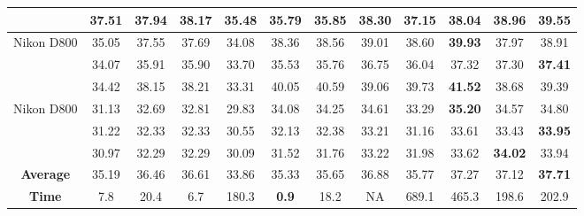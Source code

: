 \begin{table}
\begin{adjustwidth}{-2cm}{}
\begin{center}
\begin{tabular}{|c||c|c|c|c|c|c|c|c|c|c|c|}
\cline{2-12}    
& 37.51 & 37.94 & 38.17 & 35.48 & 35.79 & 35.85 & 38.30 & 37.15 & 38.04 & 38.96 & \textbf{39.55}
\\
\hline
\multirow{3}{*}{Nikon D800} 
& 35.05 & 37.55 & 37.69 & 34.08 & 38.36 & 38.56 & 39.01 & 38.60 & \textbf{39.93} & 37.97 & 38.91
\\ 
\cline{2-12} 
\multirow{3}{*}{ISO = 3200}   
& 34.07 & 35.91 & 35.90 & 33.70 & 35.53 & 35.76 & 36.75 & 36.04 & 37.32 & 37.30 & \textbf{37.41}
\\ 
\cline{2-12}    
& 34.42 & 38.15 & 38.21 & 33.31 & 40.05 & 40.59 & 39.06 & 39.73 & \textbf{41.52} & 38.68 & 39.39
\\ 
\hline
\multirow{3}{*}{Nikon D800} 
& 31.13 & 32.69 & 32.81 & 29.83 & 34.08 & 34.25 & 34.61 & 33.29 & \textbf{35.20} & 34.57 & 34.80
\\ 
\cline{2-12} 
\multirow{3}{*}{ISO = 6400}   
& 31.22 & 32.33 & 32.33 & 30.55 & 32.13 & 32.38  & 33.21 & 31.16 & 33.61 & 33.43 & \textbf{33.95}
\\ 
\cline{2-12}    
& 30.97 & 32.29 & 32.29 & 30.09 & 31.52 & 31.76 & 33.22 & 31.98 & 33.62 & \textbf{34.02} & 33.94
\\
\hline
\textbf{Average} 
& 35.19 & 36.46 & 36.61 & 33.86 & 35.33 & 35.65 & 36.88 & 35.77 & 37.27 & 37.12 & \textbf{ 37.71}
\\
\hline
\textbf{Time} 
& 7.8 & 20.4 & 6.7 & 180.3 & \textbf{0.9} & 18.2 & NA & 689.1 & 465.3 & 198.6 & 202.9
\\
\hline
\end{tabular}
\end{center}
\end{adjustwidth}
\end{table}

